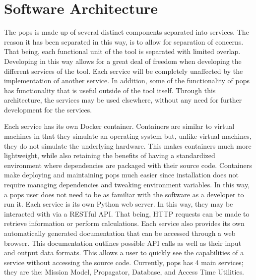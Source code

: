 \glsresetall{} 

\chapter{Software Architecture}\label{chap:architecture}

\lettrine[lines=2, findent=0pt, nindent=5pt]{T}{}he \gls{pops} is made up of
several distinct components separated into services.  The reason it has been
separated in this way, is to allow for separation of concerns. That being, each
functional unit of the tool is separated with limited overlap. Developing in
this way allows for a great deal of freedom when developing the different
services of the tool. Each service will be completely unaffected by the
implementation of another service. In addition, some of the functionality of
\gls{pops} has functionality that is useful outside of the tool itself. Through
this architecture, the services may be used elsewhere, without any need for
further development for the services.  

Each service has its own Docker container. Containers are similar to virtual
machines in that they simulate an operating system but, unlike virtual
machines, they do not simulate the underlying hardware. This makes containers
much more lightweight, while also retaining the benefits of having a
standardized environment where dependencies are packaged with their source
code. Containers make deploying and maintaining \gls{pops} much easier since
installation does not require managing dependencies and tweaking environment
variables. In this way, a \gls{pops} user does not need to be as familiar with
the software as a developer to run it.  Each service is its own Python web
server. In this way, they may be interacted with via a RESTful API. That being,
HTTP requests can be made to retrieve information or perform calculations. Each
service also provides its own automatically generated documentation that can be
accessed through a web browser. This documentation outlines possible API calls
as well as their input and output data formats.  This allows a user to quickly
see the capabilities of a service without accessing the source code. Currently,
\gls{pops} has 4 main services; they are the: Mission Model, Propagator,
Database, and Access Time Utilities.


